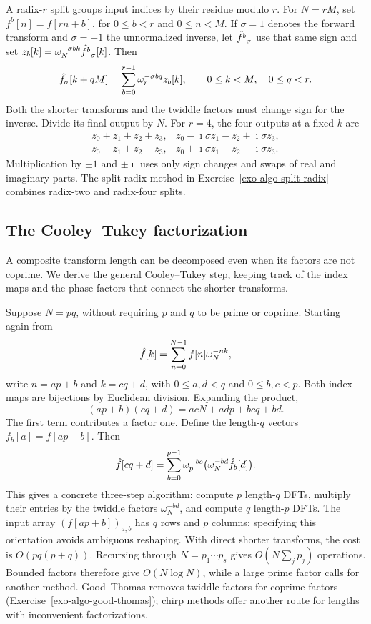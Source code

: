 \begin{rem}
\label{rmk-radix-fft}
A radix-$r$ split groups input indices by their residue modulo $r$.
For $N=rM$, set $f^b[n]=f[rn+b]$, for $0\leq b<r$ and $0\leq n<M$.
If $\sigma=1$ denotes the forward transform and $\sigma=-1$ the
unnormalized inverse, let $\hat{f^b}_{\sigma}$ use that same sign and set
$z_b[k]=\omega_N^{-\sigma bk}\hat{f^b}_{\sigma}[k]$.
Then
\[
 \hat{f}_{\sigma}[k+qM]=\sum_{b=0}^{r-1}\omega_r^{-\sigma bq}z_b[k],
 \qquad 0\leq k<M,\quad 0\leq q<r.
\]
Both the shorter transforms and the twiddle factors must change sign for
the inverse. Divide its final output by $N$.
For $r=4$, the four outputs at a fixed $k$ are
\[
\begin{array}{ll}
 z_0+z_1+z_2+z_3,&z_0-\imath\sigma z_1-z_2+\imath\sigma z_3,\\
 z_0-z_1+z_2-z_3,&z_0+\imath\sigma z_1-z_2-\imath\sigma z_3.
\end{array}
\]
Multiplication by $\pm1$ and $\pm\imath$ uses only sign changes and swaps
of real and imaginary parts. The split-radix method in
Exercise~\ref{exo-algo-split-radix} combines radix-two and radix-four splits.
\end{rem}

\subsection{The Cooley--Tukey factorization}
\label{sect2-transfo-cooley-tukey}

A composite transform length can be decomposed even when its factors are not
coprime. We derive the general Cooley--Tukey step, keeping track of the
index maps and the phase factors that connect the shorter transforms.

Suppose $N=pq$, without requiring $p$ and $q$ to be prime or coprime.
Starting again from
\begin{equation}
\label{eq-tfd-transfo-cooley-tukey}
 \hat{f}[k]=\sum_{n=0}^{N-1}f[n]\omega_N^{-nk},
\end{equation}
write $n=ap+b$ and $k=cq+d$, with
$0\leq a,d<q$ and $0\leq b,c<p$.
Both index maps are bijections by Euclidean division. Expanding the product,
\[
 (ap+b)(cq+d)=acN+adp+bcq+bd.
\]
The first term contributes a factor one. Define the length-$q$ vectors
$f_b[a]=f[ap+b]$. Then
\begin{equation}
\label{eqn-cooley-tukey-twiddle}
 \hat{f}[cq+d]=\sum_{b=0}^{p-1}\omega_p^{-bc}
                         \bigl(\omega_N^{-bd}\hat{f_b}[d]\bigr).
\end{equation}
This gives a concrete three-step algorithm: compute $p$ length-$q$ DFTs,
multiply their entries by the twiddle factors $\omega_N^{-bd}$, and compute
$q$ length-$p$ DFTs. The input array $(f[ap+b])_{a,b}$ has $q$ rows and
$p$ columns; specifying this orientation avoids ambiguous reshaping.
With direct shorter transforms, the cost is $O(pq(p+q))$.
Recursing through $N=p_1\cdots p_s$ gives $O(N\sum_jp_j)$ operations.
Bounded factors therefore give $O(N\log N)$, while a large prime factor
calls for another method. Good--Thomas removes twiddle factors for coprime
factors (Exercise~\ref{exo-algo-good-thomas}); chirp methods offer another
route for lengths with inconvenient factorizations.

